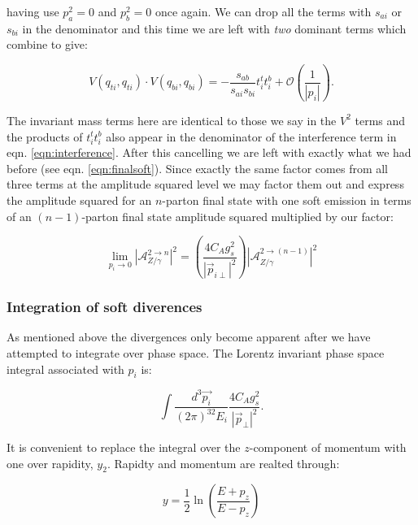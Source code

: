 			having use $p_a^2=0$ and $p_b^2=0$ once again.  We can drop all the terms with $s_{ai}$ or
			$s_{bi}$ in the denominator and this time we are left with \emph{two} dominant terms which
			combine to give:

			\begin{equation}
				V(q_{ti}, q_{ti})\cdot V(q_{bi}, q_{bi}) = -\frac{s_{ab}}{s_{ai}s_{bi}}t_i^tt_i^b +
					\mathcal{O}\left(\frac{1}{|p_i|}\right).
			\end{equation}

			The invariant mass terms here are identical to those we say in the $V^2$ terms and the products of
			$t_i^tt_i^b$ also appear in the denominator of the interference term in eqn. \eqref{eqn:interference}.
			After this cancelling we are left with exactly what we had before (see eqn. \eqref{eqn:finalsoft}).
			Since exactly the same factor comes from all three terms at the amplitude squared level we may factor
			them out and express the amplitude squared for an $n$-parton final state with one soft emission in
			terms of an $(n-1)$-parton final state amplitude squared multiplied by our factor:

			\begin{equation}
				\lim_{p_i\rightarrow0} |\mathcal{A}_{Z/\gamma}^{2\rightarrow n}|^2 = \left(\frac{4C_Ag_s^2}{|\vec{p}_{i\perp}|^2}\right)
					|\mathcal{A}_{Z/\gamma}^{2\rightarrow (n-1)}|^2
			\end{equation}

		\subsubsection{Integration of soft diverences}
			\label{sub:subsection_name}

			As mentioned above the divergences only become apparent after we have attempted to integrate over
			phase space.  The Lorentz invariant phase space integral associated with $p_i$ is:

			\begin{equation}
				\int\frac{d^3\vec{p_i}}{(2\pi)^32E_i}\frac{4C_Ag_s^2}{|\vec{p}_\perp|^2}.
			\end{equation}

			It is convenient to replace the integral over the $z$-component of momentum with one over rapidity,
			$y_2$.  Rapidty and momentum are realted through:

			\begin{equation}
				y = \frac12\ln\left(\frac{E + p_z}{E - p_z}\right)
			\end{equation}

